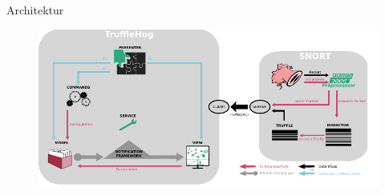 \begin{frame}{Architektur}
    \begin{figure}
    	\centering
    	\includegraphics[width=\textwidth]{./images/15.pdf}
    \end{figure}
\end{frame}
